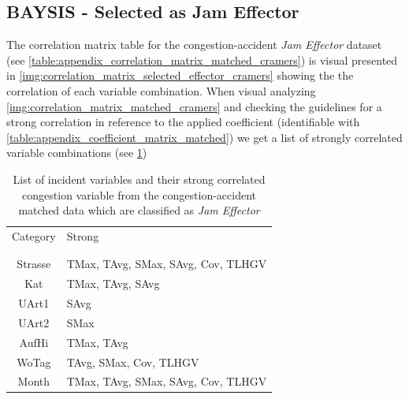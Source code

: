 \subsection{BAYSIS - Selected as Jam Effector}
\label{analysis_processing_correlation_baysis_effector}
The correlation matrix table for the congestion-accident \textit{Jam Effector} dataset (see \cref{table:appendix_correlation_matrix_matched_cramers}) is visual presented in \cref{img:correlation_matrix_selected_effector_cramers} showing the the correlation of each variable combination. When visual analyzing \cref{img:correlation_matrix_matched_cramers} and checking the guidelines for a strong correlation in reference to the applied coefficient (identifiable with \cref{table:appendix_coefficient_matrix_matched}) we get a list of strongly correlated variable combinations (see \cref{tbl:correlation_list_baysis_effector})

\noindent
\begin{table}[h!]
	\centering
	\begin{tabular}{c|l}  
		Category & Strong \\
		\\[-1em]
		\hline
		\\[-1em]
		Strasse & TMax, TAvg, SMax, SAvg, Cov, TLHGV \\ 
 		Kat & TMax, TAvg, SAvg \\ 
 		UArt1 & SAvg \\
 		UArt2 & SMax \\
 		AufHi & TMax, TAvg \\
 		WoTag & TAvg, SMax, Cov, TLHGV \\
 		Month & TMax, TAvg, SMax, SAvg, Cov, TLHGV \\
	\end{tabular}
    \caption{List of incident variables and their strong correlated congestion variable from the congestion-accident matched data which are classified as \textit{Jam Effector}}
	\label{tbl:correlation_list_baysis_effector}
\end{table}

